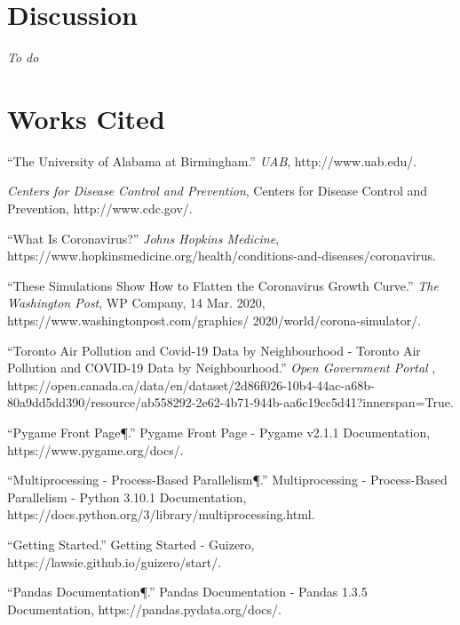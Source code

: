 \documentclass{article}
\begin{document}
\section{Discussion}
\textit{To do}
\bigskip

\section{Works Cited}

“The University of Alabama at Birmingham.” \emph{UAB}, http://www.uab.edu/.
\bigskip

\emph{Centers for Disease Control and Prevention}, Centers for Disease Control and
Prevention, http://www.cdc.gov/. 
\bigskip 
 
“What Is Coronavirus?” \emph{Johns Hopkins Medicine}, 
https://www.hopkinsmedicine.org/health/conditions-and-diseases/coronavirus. 
\bigskip

“These Simulations Show How to Flatten the Coronavirus Growth Curve.” \emph{The Washington
Post}, WP Company, 14 Mar. 2020, 
https://www.washingtonpost.com/graphics/
2020/world/corona-simulator/. 
\bigskip

“Toronto Air Pollution and Covid-19 Data by Neighbourhood - Toronto Air Pollution and COVID-19 Data by Neighbourhood.” \emph{Open Government Portal} , https://open.canada.ca/data/en/dataset/2d86f026-10b4-44ac-a68b-80a9dd5dd390/resource/ab558292-2e62-4b71-944b-aa6c19cc5d41?innerspan=True. 
\bigskip

“Pygame Front Page¶.” Pygame Front Page - Pygame v2.1.1 Documentation, https://www.pygame.org/docs/. 
\bigskip

“Multiprocessing - Process-Based Parallelism¶.” Multiprocessing - Process-Based Parallelism - Python 3.10.1 Documentation, https://docs.python.org/3/library/multiprocessing.html. 
\bigskip

“Getting Started.” Getting Started - Guizero, https://lawsie.github.io/guizero/start/. 
\bigskip

“Pandas Documentation¶.” Pandas Documentation - Pandas 1.3.5 Documentation, https://pandas.pydata.org/docs/. 
\bigskip
\end{document}
